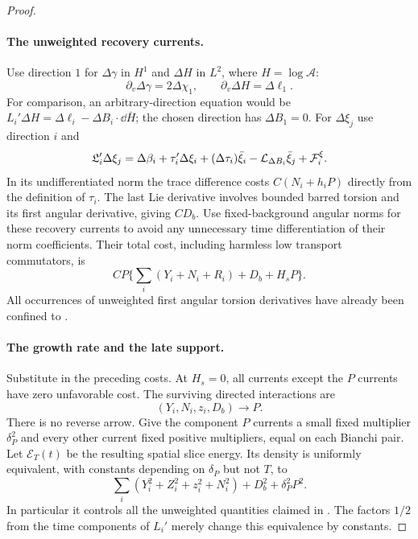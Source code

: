 \begin{proof}
\paragraph{The unweighted recovery currents.}
Use direction $1$ for $\Delta\gamma$ in $H^1$ and
$\Delta H$ in $L^2$, where $H=\log\mathcal A$:
\begin{equation}\label{dn:P-transport}
 \partial_v\Delta\gamma=2\Delta\chi_1,
                    \qquad\partial_v\Delta H=\Delta\ell_1.
\end{equation}
For comparison, an arbitrary-direction equation would be
$L_i'\Delta H=\Delta\ell_i-\Delta B_i\cdot\dd\bar H$;
the chosen direction has $\Delta B_1=0$.
For $\Delta\xi_j$ use direction $i$ and
\begin{equation}\label{dn:torsion-difference}
 \mathfrak L_i'\Delta\xi_j
 =\Delta\beta_i+\tau_i'\Delta\xi_i
       +(\Delta\tau_i)\bar\xi_i
       -\mathcal L_{\Delta B_i}\bar\xi_j+\mathcal F_i^\xi.
\end{equation}
In its undifferentiated norm the trace difference costs
$C(N_i+h_iP)$ directly from the definition of $\tau_i$.
The last Lie derivative involves bounded barred torsion and its
first angular derivative, giving $CD_b$.  Use fixed-background
angular norms for these recovery currents to avoid any unnecessary
time differentiation of their norm coefficients.  Their total cost,
including harmless low transport commutators, is
\begin{equation}\label{dn:low-P-cost}
 CP\big\{\sum_i(Y_i+N_i+R_i)+D_b+H_sP\big\}.
\end{equation}
All occurrences of unweighted first angular torsion derivatives
have already been confined to .

\paragraph{The growth rate and the late support.}
Substitute  in the preceding costs.
At $H_s=0$, all currents except the $P$ currents have zero
unfavorable cost.  The surviving directed interactions are
\begin{equation}\label{dn:limiting-graph}
 (Y_i,N_i,z_i,D_b)\longrightarrow P.
\end{equation}
There is no reverse arrow.  Give the component $P$ currents a
small fixed multiplier $\delta_P^2$ and every other current fixed
positive multipliers, equal on each Bianchi pair.  Let
$\mathcal E_T(t)$ be the resulting spatial slice energy.  Its
density is uniformly equivalent, with constants depending on
$\delta_P$ but not $T$, to
\begin{equation}\label{dn:energy-equivalence}
 \sum_i(Y_i^2+Z_i^2+z_i^2+N_i^2)+D_b^2+\delta_P^2P^2.
\end{equation}
In particular it controls all the unweighted quantities claimed in
.  The factors $1/2$ from the time
components of $L_i'$ merely change this equivalence by constants.


\end{proof}
